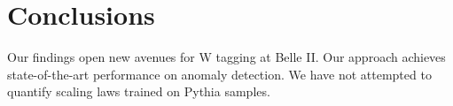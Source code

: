 \section{Conclusions}\label{sec:conclusions}

Our findings open new avenues for W tagging at Belle II. Our approach
achieves state-of-the-art performance on anomaly detection. We have not
attempted to quantify scaling laws trained on Pythia samples.

